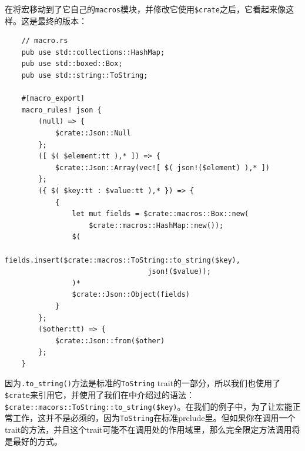 在将宏移动到了它自己的\texttt{macros}模块，并修改它使用\texttt{\$crate}之后，它看起来像这样。这是最终的版本：
\begin{verbatim}
    // macro.rs
    pub use std::collections::HashMap;
    pub use std::boxed::Box;
    pub use std::string::ToString;

    #[macro_export]
    macro_rules! json {
        (null) => {
            $crate::Json::Null
        };
        ([ $( $element:tt ),* ]) => {
            $crate::Json::Array(vec![ $( json!($element) ),* ])
        };
        ({ $( $key:tt : $value:tt ),* }) => {
            {
                let mut fields = $crate::macros::Box::new(
                    $crate::macros::HashMap::new());
                $(
                    fields.insert($crate::macros::ToString::to_string($key), 
                                  json!($value));
                )*
                $crate::Json::Object(fields)
            }
        };
        ($other:tt) => {
            $crate::Json::from($other)
        };
    }
\end{verbatim}

因为\texttt{.to\_string()}方法是标准的\texttt{ToString} trait的一部分，所以我们也使用了\texttt{\$crate}来引用它，并使用了我们在中介绍过的语法：\texttt{\$crate::macors::ToString::to\_string(\$key)}。在我们的例子中，为了让宏能正常工作，这并不是必须的，因为\texttt{ToString}在标准prelude里。但如果你在调用一个trait的方法，并且这个trait可能不在调用处的作用域里，那么完全限定方法调用将是最好的方式。



